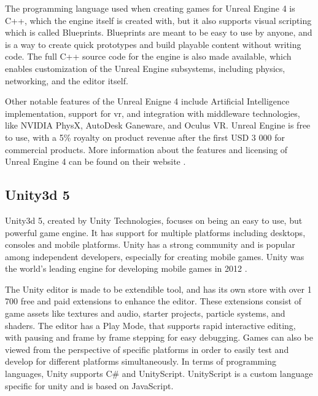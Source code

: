 The programming language used when creating games for Unreal Engine 4 is C++, which the engine itself is created with, but it also supports visual scripting which is called Blueprints. Blueprints are meant to be easy to use by anyone, and is a way to create quick prototypes and build playable content without writing code. The full C++ source code for the engine is also made available, which enables customization of the Unreal Engine subsystems, including physics, networking, and the editor itself.

Other notable features of the Unreal Enigne 4 include Artificial Intelligence implementation, support for \gls{vr}, and integration with middleware technologies, like NVIDIA PhysX, AutoDesk Ganeware, and Oculus VR. Unreal Engine is free to use, with a 5\% royalty on product revenue after the first USD 3 000 for commercial products. More information about the features and licensing of Unreal Engine 4 can be found on their website \cite{unreal2016engine}.


\subsection{Unity3d 5}
Unity3d 5, created by Unity Technologies, focuses on being an easy to use, but powerful game engine. It has support for multiple platforms including desktops, consoles and mobile platforms. Unity has a strong community and is popular among independent developers, especially for creating mobile games. Unity was the world's leading engine for developing mobile games in 2012 \cite{bratcher2013unity}.

The Unity editor is made to be extendible tool, and has its own store with over 1 700 free and paid extensions to enhance the editor. These extensions consist of game assets like textures and audio, starter projects, particle systems, and shaders. The editor has a Play Mode, that supports rapid interactive editing, with pausing and frame by frame stepping for easy debugging. Games can also be viewed from the perspective of specific platforms in order to easily test and develop for different platforms simultaneously. In terms of programming languages, Unity supports C\# and UnityScript. UnityScript is a custom language specific for unity and is based on JavaScript. \cite{unity2016editor, unity2016script}

